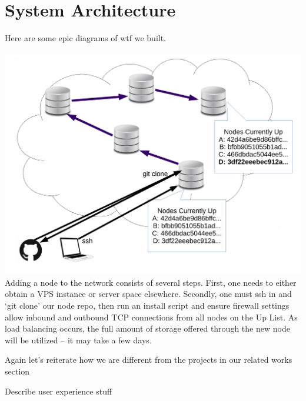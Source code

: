 \section{System Architecture}
\label{sec:arch}

Here are some epic diagrams of wtf we built.

\begin{center}
    \includegraphics[scale=0.3]{figs/addingaNode.pdf}
    \\
    \small{Adding a node to the network consists of several steps. First, one needs to either obtain a VPS instance or
    server space elsewhere. Secondly, one must ssh in and `git clone' our node repo, then run an install script and
    ensure firewall settings allow inbound and outbound TCP connections from all nodes on the Up List. As load balancing
    occurs, the full amount of storage offered through the new node will be utilized -- it may take a few days.}
    \\
\end{center}

Again let's reiterate how we are different from the projects in our related works section

Describe user experience stuff

